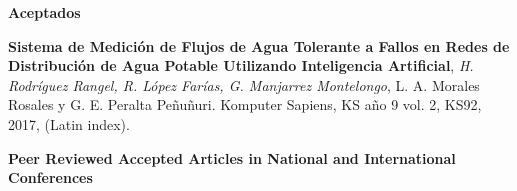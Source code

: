 \documentclass[10pt]{article}
\newenvironment{innerlist}[1][\enskip\textbullet]%
        {\begin{compactitem}[#1]}{\end{compactitem}}
\newcommand{\blankline}{\quad\pagebreak[2]}
\begin{document}
\begin{innerlist}
\blankline

\textbf{Aceptados}

\begin{innerlist}


\item \textbf{Sistema de Medición de Flujos de Agua Tolerante a Fallos en Redes de Distribución de Agua Potable Utilizando Inteligencia Artificial}, \textit{H. Rodríguez Rangel, R. López Farías, G. Manjarrez Montelongo}, L. A. Morales Rosales y G. E. Peralta Peñuñuri. Komputer Sapiens, KS año 9 vol. 2, KS92, 2017, (Latin index).

\end{innerlist}

\blankline

\end{innerlist}

\textbf{Peer Reviewed Accepted Articles in National and International Conferences}

\blankline
\end{document}
